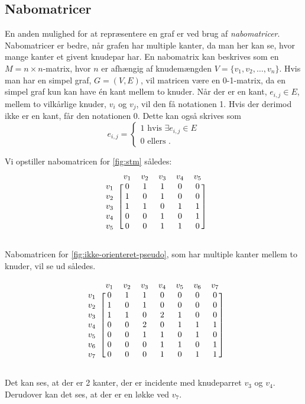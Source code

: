 \subsection{Nabomatricer}
En anden mulighed for at repræsentere en graf er ved brug af \emph{nabomatricer}. Nabomatricer er bedre, når grafen har multiple kanter, da man her kan se, hvor mange kanter et givent knudepar har.
En nabomatrix kan beskrives som en $M=n \times n$-matrix, hvor $n$ er afhængig af knudemængden $V=\{v_1, v_2, \dotsc, v_n\}$. Hvis man har en simpel graf, $G=(V,E)$, vil matricen være en 0-1-matrix, da en simpel graf kun kan have én kant mellem to knuder. Når der er en kant, $e_{i,j} \in E$, mellem to vilkårlige knuder, $v_i$ og $v_j$,  vil den få notationen 1. Hvis der derimod ikke er en kant, får den notationen 0.
Dette kan også skrives som
\begin{equation}
	e_{i,j} =	
	\begin{cases}
		1 \mbox{ hvis } \exists e_{i,j} \in E \\
		0 \mbox{ ellers }.
	\end{cases}
\end{equation}



Vi opstiller nabomatricen for \autoref{fig:stm} således:
\begin{equation} \label{mat:nabo1}
\begin{blockarray}{rccccc}
		&v_1&v_2&v_3&v_4&v_5 \\
\begin{block}{r[ccccc]}
		v_1&0&1&1&0&0 \\
		v_2&1&0&1&0&0 \\
		v_3&1&1&0&1&1 \\
		v_4&0&0&1&0&1 \\
		v_5&0&0&1&1&0 \\
\end{block}
\end{blockarray}
\end{equation}

Nabomatricen for \autoref{fig:ikke-orienteret-pseudo}, som har multiple kanter mellem to knuder, vil se ud således.

\begin{equation}
\begin{blockarray}{rccccccc}
	&v_1&v_2&v_3&v_4&v_5&v_6&v_7 \\
\begin{block}{r[ccccccc]}
	v_1&0&1&1&0&0&0&0 \\
	v_2&1&0&1&0&0&0&0 \\
	v_3&1&1&0&2&1&0&0 \\
	v_4&0&0&2&0&1&1&1 \\
	v_5&0&0&1&1&0&1&0 \\
	v_6&0&0&0&1&1&0&1 \\
	v_7&0&0&0&1&0&1&1 \\
\end{block}
\end{blockarray}	
\end{equation}

Det kan ses, at der er 2 kanter, der er incidente med knudeparret $v_3$ og $v_4$. Derudover kan det ses, at der er en løkke ved $v_7$.

